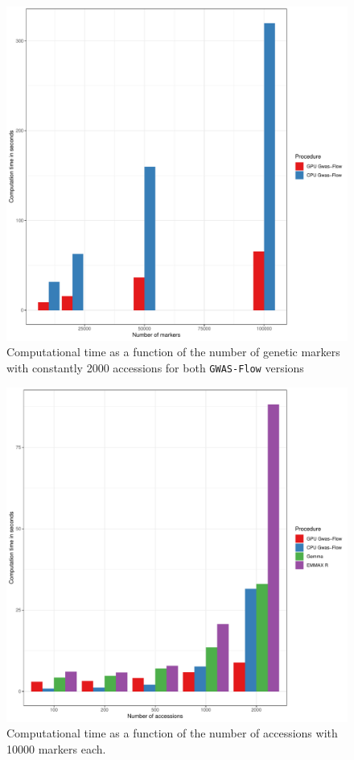 \begin{figure}[th]
\centering
\includegraphics[height=.55\textheight, width=1.1\textwidth]{Figures/time_markers_gwas}
\decoRule
\caption[Computation time vs number of markers]{Computational time as a function of the number of genetic markers with constantly 2000 accessions for both \texttt{GWAS-Flow} versions}
\label{fig:time_marker}
\end{figure}


\begin{figure}[th]
\centering
\includegraphics[height=.55\textheight, width=1.1\textwidth]{Figures/comp_time_gwas}
\decoRule
\caption[Computations time vs accessions]{Computational time as a function of the number of accessions with 10000 markers each.}
\label{fig:time_accessions}
\end{figure}


